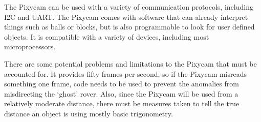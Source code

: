 \documentclass[12pt,letterpaper]{article}
\begin{document}
The Pixycam can be used with a variety of communication protocols, including I2C and UART. The Pixycam comes with software that can already interpret things such as balls or blocks, but is also programmable to look for user defined objects. It is compatible with a variety of devices, including most microprocessors. 

There are some potential problems and limitations to the Pixycam that must be accounted for. It provides fifty frames per second, so if the Pixycam misreads something one frame, code needs to be used to prevent the anomalies from misdirecting the ‘ghost’ rover. Also, since the Pixycam will be used from a relatively moderate distance, there must be measures taken to tell the true distance an object is using mostly basic trigonometry. 
\end{document}
